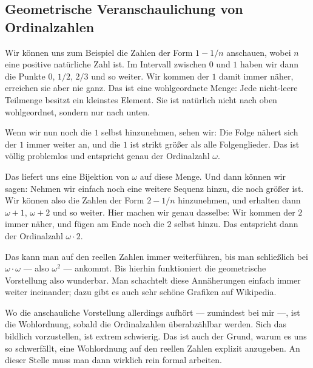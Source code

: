 \subsection{Geometrische Veranschaulichung von Ordinalzahlen}

\begin{spoken-clean}[00:52:10 - 00:54:20]
Wir können uns zum Beispiel die Zahlen der Form $1 - 1/n$ anschauen, wobei $n$ eine positive natürliche Zahl ist. Im Intervall zwischen $0$ und $1$ haben wir dann die Punkte $0$, $1/2$, $2/3$ und so weiter. Wir kommen der $1$ damit immer näher, erreichen sie aber nie ganz. Das ist eine wohlgeordnete Menge: Jede nicht-leere Teilmenge besitzt ein kleinstes Element. Sie ist natürlich nicht nach oben wohlgeordnet, sondern nur nach unten.

Wenn wir nun noch die $1$ selbst hinzunehmen, sehen wir: Die Folge nähert sich der $1$ immer weiter an, und die $1$ ist strikt größer als alle Folgenglieder. Das ist völlig problemlos und entspricht genau der Ordinalzahl $\omega$.
\end{spoken-clean}

\begin{spoken-clean}[00:54:20 - 00:56:40]
Das liefert uns eine Bijektion von $\omega$ auf diese Menge. Und dann können wir sagen: Nehmen wir einfach noch eine weitere Sequenz hinzu, die noch größer ist. Wir können also die Zahlen der Form $2 - 1/n$ hinzunehmen, und erhalten dann $\omega + 1$, $\omega + 2$ und so weiter. Hier machen wir genau dasselbe: Wir kommen der $2$ immer näher, und fügen am Ende noch die $2$ selbst hinzu. Das entspricht dann der Ordinalzahl $\omega \cdot 2$.

Das kann man auf den reellen Zahlen immer weiterführen, bis man schließlich bei $\omega \cdot \omega$ --- also $\omega^2$ --- ankommt. Bis hierhin funktioniert die geometrische Vorstellung also wunderbar. Man schachtelt diese Annäherungen einfach immer weiter ineinander; dazu gibt es auch sehr schöne Grafiken auf Wikipedia.

Wo die anschauliche Vorstellung allerdings aufhört --- zumindest bei mir ---, ist die Wohlordnung, sobald die Ordinalzahlen überabzählbar werden. Sich das bildlich vorzustellen, ist extrem schwierig. Das ist auch der Grund, warum es uns so schwerfällt, eine Wohlordnung auf den reellen Zahlen explizit anzugeben. An dieser Stelle muss man dann wirklich rein formal arbeiten.
\end{spoken-clean}

